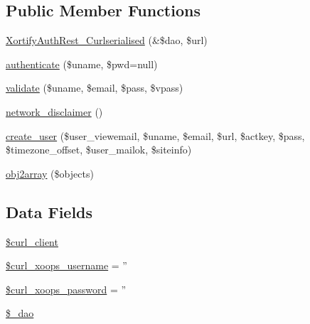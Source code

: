 \subsection*{Public Member Functions}
\begin{DoxyCompactItemize}
\item 
\hyperlink{class_xortify_auth_rest___curlserialised_a830d8746a22e602284bf83fcd432ec07}{Xortify\-Auth\-Rest\-\_\-\-Curlserialised} (\&\$dao, \$url)
\item 
\hyperlink{class_xortify_auth_rest___curlserialised_a00678ba307326b734e6c679f28bea315}{authenticate} (\$uname, \$pwd=null)
\item 
\hyperlink{class_xortify_auth_rest___curlserialised_a91121a1b702dfd20fb65a027c8ed26ec}{validate} (\$uname, \$email, \$pass, \$vpass)
\item 
\hyperlink{class_xortify_auth_rest___curlserialised_a1874c27b6f81a3f2ff9015405ad0f8bc}{network\-\_\-disclaimer} ()
\item 
\hyperlink{class_xortify_auth_rest___curlserialised_ac72efc5ad313a592cf6706876f56f7ec}{create\-\_\-user} (\$user\-\_\-viewemail, \$uname, \$email, \$url, \$actkey, \$pass, \$timezone\-\_\-offset, \$user\-\_\-mailok, \$siteinfo)
\item 
\hyperlink{class_xortify_auth_rest___curlserialised_aabc52e4f78557f0e0b360a8aaba6e11d}{obj2array} (\$objects)
\end{DoxyCompactItemize}
\subsection*{Data Fields}
\begin{DoxyCompactItemize}
\item 
\hyperlink{class_xortify_auth_rest___curlserialised_a402f2112991f3227835af80e9df33e38}{\$curl\-\_\-client}
\item 
\hyperlink{class_xortify_auth_rest___curlserialised_aab7480ba9f878a02b2c9fd43922fa070}{\$curl\-\_\-xoops\-\_\-username} = ''
\item 
\hyperlink{class_xortify_auth_rest___curlserialised_a6c9851541ed3826c67cfe7224c38f0b8}{\$curl\-\_\-xoops\-\_\-password} = ''
\item 
\hyperlink{class_xortify_auth_rest___curlserialised_a12a029c610f699b4b25e79a1f64a3485}{\$\-\_\-dao}
\end{DoxyCompactItemize}



